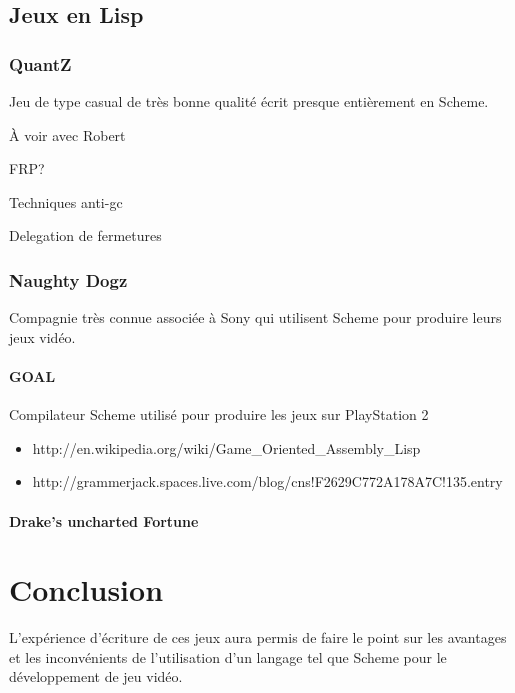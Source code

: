 \documentclass[12pt,oneside,letterpaper,francais]{book}
\begin{document}
\section{Jeux en Lisp}

\subsection{QuantZ}
Jeu de type \og casual \fg de très bonne qualité écrit presque
entièrement en Scheme.

À voir avec Robert

FRP?

Techniques anti-gc

Delegation de fermetures

\subsection{Naughty Dogz}
Compagnie très connue associée à Sony qui utilisent Scheme pour
produire leurs jeux vidéo.

\subsubsection{GOAL}
Compilateur Scheme utilisé pour produire les jeux sur PlayStation 2

\begin{itemize}
\item http://en.wikipedia.org/wiki/Game\_Oriented\_Assembly\_Lisp
\item http://grammerjack.spaces.live.com/blog/cns!F2629C772A178A7C!135.entry
\end{itemize}

\subsubsection{Drake's uncharted Fortune}


\chapter{Conclusion}


L'expérience d'écriture de ces jeux aura permis de faire le point sur
les avantages et les inconvénients de l'utilisation d'un langage tel
que Scheme pour le développement de jeu vidéo.
\end{document}
